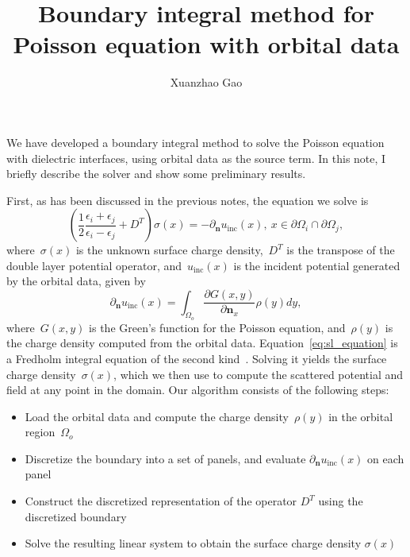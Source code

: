 \documentclass[prb,amsmath,amssymb, 10pt]{revtex4}
\begin{document}

\title{Boundary integral method for Poisson equation with orbital data}
\author{Xuanzhao Gao}

\maketitle

We have developed a boundary integral method to solve the Poisson equation with dielectric interfaces, using orbital data as the source term.
In this note, I briefly describe the solver and show some preliminary results.

First, as has been discussed in the previous notes, the equation we solve is
\begin{equation}\label{eq:sl_equation}
    \left( \frac{1}{2} \frac{\epsilon_i + \epsilon_j}{\epsilon_i - \epsilon_j} + D^T \right) \sigma(x) = - \partial_{\mathbf{n}} u_{\text{inc}}(x),~x \in \partial \Omega_i \cap \partial \Omega_j,
\end{equation}
where~$\sigma(x)$ is the unknown surface charge density,~$D^T$ is the transpose of the double layer potential operator, and~$u_{\text{inc}}(x)$ is the incident potential generated by the orbital data, given by
\begin{equation}
    \partial_{\mathbf{n}} u_{\text{inc}}(x) = \int_{\Omega_o} \frac{\partial G(x,y)}{\partial \mathbf{n}_x} \rho(y) dy,
\end{equation}
where~$G(x,y)$ is the Green's function for the Poisson equation, and~$\rho(y)$ is the charge density computed from the orbital data.
Equation~\eqref{eq:sl_equation} is a Fredholm integral equation of the second kind~\cite{greengard1994numerical}. Solving it yields the surface charge density~$\sigma(x)$, which we then use to compute the scattered potential and field at any point in the domain.
Our algorithm consists of the following steps:
\begin{itemize}
    \item[1.] Load the orbital data and compute the charge density~$\rho(y)$ in the orbital region~$\Omega_o$
    \item[2.] Discretize the boundary into a set of panels, and evaluate $\partial_{\mathbf{n}} u_{\text{inc}}(x)$ on each panel
    \item[3.] Construct the discretized representation of the operator $D^T$ using the discretized boundary
    \item[4.] Solve the resulting linear system to obtain the surface charge density $\sigma(x)$
\end{itemize}
\end{document}
